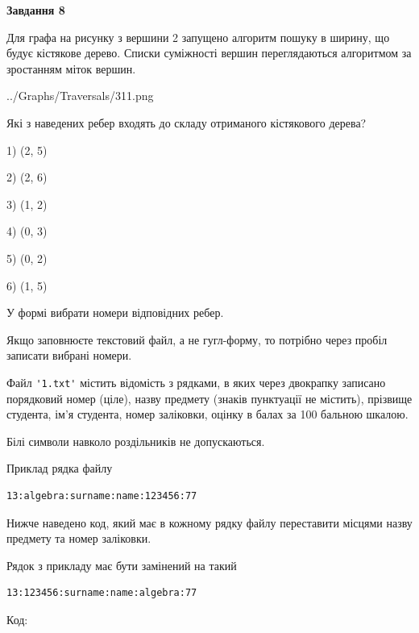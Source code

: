 \documentclass[12pt, ukrainian]{article}
\def\code#1{\Verb!#1!}
\begin{document}
{\begin {large}
{\begin {center}\textbf{Завдання 8}\end {center}}\par
Для графа на рисунку з вершини 2 запущено алгоритм пошуку в ширину, що будує кістякове дерево. Списки суміжності вершин переглядаються алгоритмом за зростанням міток вершин.\par
\begin{center}
	{../Graphs/Traversals/311.png}
\end{center}
\par Які з наведених ребер входять до складу отриманого кістякового дерева?\par
1) (2, 5)\par
2) (2, 6)\par
3) (1, 2)\par
4) (0, 3)\par
5) (0, 2)\par
6) (1, 5)\par
{\vskip 15pt} У формі вибрати номери відповідних ребер.


Якщо заповнюєте текстовий файл, а не гугл-форму, то потрібно через пробіл записа\-ти вибрані номери.\par
\newpage


Файл \code{'1.txt'} містить відомість з рядками, в яких через двокрапку записано поряд\-ковий номер (ціле), назву предмету (знаків пунктуації не містить), прізвище студента, ім'я студента, номер заліковки, оцінку в балах за 100 бальною шкалою.

Білі символи навколо роздільників не допускаються.

Приклад рядка файлу



\begin{verbatim}
13:algebra:surname:name:123456:77
\end{verbatim}


Нижче наведено код, який має в кожному рядку файлу переставити місцями назву предмету та номер заліковки.

Рядок з прикладу має бути замінений на такий



\begin{verbatim}
13:123456:surname:name:algebra:77
\end{verbatim}




Код:




\end{large}}
\end{document}
